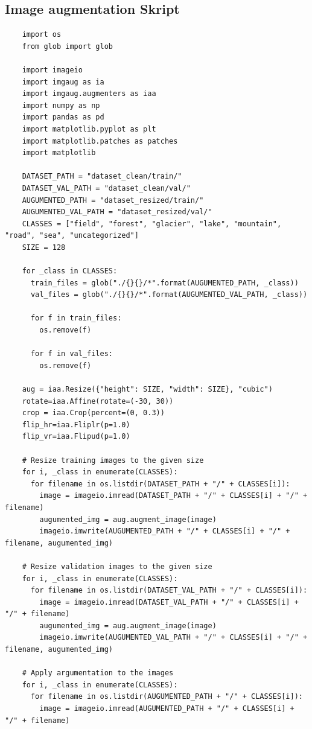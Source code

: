 \subsection{Image augmentation Skript}
\begin{longlisting}
  \begin{verbatim}
    import os
    from glob import glob

    import imageio
    import imgaug as ia
    import imgaug.augmenters as iaa
    import numpy as np
    import pandas as pd
    import matplotlib.pyplot as plt
    import matplotlib.patches as patches
    import matplotlib

    DATASET_PATH = "dataset_clean/train/"
    DATASET_VAL_PATH = "dataset_clean/val/"
    AUGUMENTED_PATH = "dataset_resized/train/"
    AUGUMENTED_VAL_PATH = "dataset_resized/val/"
    CLASSES = ["field", "forest", "glacier", "lake", "mountain", "road", "sea", "uncategorized"]
    SIZE = 128

    for _class in CLASSES:
      train_files = glob("./{}{}/*".format(AUGUMENTED_PATH, _class))
      val_files = glob("./{}{}/*".format(AUGUMENTED_VAL_PATH, _class))

      for f in train_files:
        os.remove(f)

      for f in val_files:
        os.remove(f)

    aug = iaa.Resize({"height": SIZE, "width": SIZE}, "cubic")
    rotate=iaa.Affine(rotate=(-30, 30))
    crop = iaa.Crop(percent=(0, 0.3))
    flip_hr=iaa.Fliplr(p=1.0)
    flip_vr=iaa.Flipud(p=1.0)

    # Resize training images to the given size
    for i, _class in enumerate(CLASSES):
      for filename in os.listdir(DATASET_PATH + "/" + CLASSES[i]):
        image = imageio.imread(DATASET_PATH + "/" + CLASSES[i] + "/" + filename)
        augumented_img = aug.augment_image(image)
        imageio.imwrite(AUGUMENTED_PATH + "/" + CLASSES[i] + "/" + filename, augumented_img)

    # Resize validation images to the given size
    for i, _class in enumerate(CLASSES):
      for filename in os.listdir(DATASET_VAL_PATH + "/" + CLASSES[i]):
        image = imageio.imread(DATASET_VAL_PATH + "/" + CLASSES[i] + "/" + filename)
        augumented_img = aug.augment_image(image)
        imageio.imwrite(AUGUMENTED_VAL_PATH + "/" + CLASSES[i] + "/" + filename, augumented_img)

    # Apply argumentation to the images
    for i, _class in enumerate(CLASSES):
      for filename in os.listdir(AUGUMENTED_PATH + "/" + CLASSES[i]):
        image = imageio.imread(AUGUMENTED_PATH + "/" + CLASSES[i] + "/" + filename)


\end{verbatim}
\end{longlisting}
